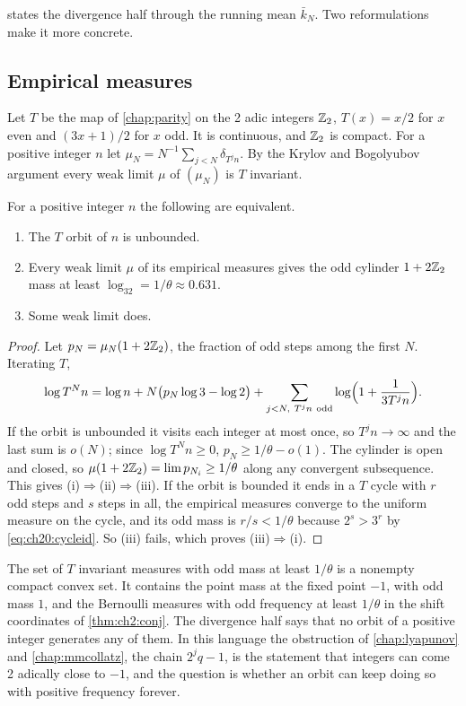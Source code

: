  states the divergence half through the running mean $\bar k_N$. Two reformulations make it more concrete.

\subsection{Empirical measures}

Let $T$ be the map of \cref{chap:parity} on the 2 adic integers $\mathbb{Z}_2$, $T(x)=x/2$ for $x$ even and $(3x+1)/2$ for $x$ odd. It is continuous, and $\mathbb{Z}_2$ is compact. For a positive integer $n$ let $\mu_N=N^{-1}\sum_{j<N}\delta_{T^jn}$. By the Krylov and Bogolyubov argument every weak limit $\mu$ of $(\mu_N)$ is $T$ invariant.

\begin{theorem}\label{thm:ch20:measure}
For a positive integer $n$ the following are equivalent.
\begin{enumerate}[label=(\roman*)]
\item The $T$ orbit of $n$ is unbounded.
\item Every weak limit $\mu$ of its empirical measures gives the odd cylinder $1+2\mathbb{Z}_2$ mass at least $\log_32=1/\theta\approx0.631$.
\item Some weak limit does.
\end{enumerate}
\end{theorem}

\begin{proof}
Let $p_N=\mu_N(1+2\mathbb{Z}_2)$, the fraction of odd steps among the first $N$. Iterating $T$,
\[
\log T^Nn=\log n+N\bigl(p_N\log3-\log2\bigr)+\sum_{j<N,\ T^jn\ \mathrm{odd}}\log\Bigl(1+\frac{1}{3T^jn}\Bigr).
\]
If the orbit is unbounded it visits each integer at most once, so $T^jn\to\infty$ and the last sum is $o(N)$; since $\log T^Nn\ge0$, $p_N\ge1/\theta-o(1)$. The cylinder is open and closed, so $\mu(1+2\mathbb{Z}_2)=\lim p_{N_i}\ge1/\theta$ along any convergent subsequence. This gives (i)$\Rightarrow$(ii)$\Rightarrow$(iii). If the orbit is bounded it ends in a $T$ cycle with $r$ odd steps and $s$ steps in all, the empirical measures converge to the uniform measure on the cycle, and its odd mass is $r/s<1/\theta$ because $2^s>3^r$ by \eqref{eq:ch20:cycleid}. So (iii) fails, which proves (iii)$\Rightarrow$(i).
\end{proof}

The set of $T$ invariant measures with odd mass at least $1/\theta$ is a nonempty compact convex set. It contains the point mass at the fixed point $-1$, with odd mass $1$, and the Bernoulli measures with odd frequency at least $1/\theta$ in the shift coordinates of \cref{thm:ch2:conj}. The divergence half says that no orbit of a positive integer generates any of them. In this language the obstruction of \cref{chap:lyapunov} and \cref{chap:mmcollatz}, the chain $2^jq-1$, is the statement that integers can come 2 adically close to $-1$, and the question is whether an orbit can keep doing so with positive frequency forever.

